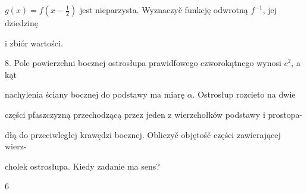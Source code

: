 \documentclass[a4paper,12pt]{article}
\begin{document}
$g(x)=f(x-\displaystyle \frac{1}{2})$ jest nieparzysta. Wyznaczyč funkcję odwrotną $f^{-1}$, jej dziedzinę

$\mathrm{i}$ zbiór wartości.

8. Pole powierzchni bocznej ostrosłupa prawidfowego czworokątnego wynosi $c^{2}$, a kąt

nachylenia ściany bocznej do podstawy ma miarę $\alpha$. Ostrosłup rozcieto na dwie

części pfaszczyzną przechodzącą przez jeden $\mathrm{z}$ wierzchołków podstawy $\mathrm{i}$ prostopa-

dłą do przeciwległej krawędzi bocznej. Obliczyč objętośč części zawierającej wierz-

cholek ostrosłupa. Kiedy zadanie ma sens?

6
\end{document}
